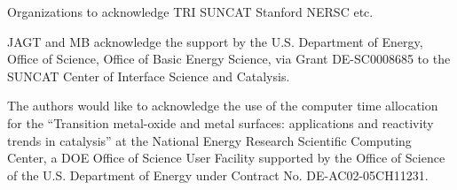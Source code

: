 

Organizations to acknowledge
TRI
SUNCAT
Stanford
NERSC
etc.

JAGT and MB acknowledge the support by the U.S. Department of Energy, Office
of Science, Office of Basic Energy Science, via Grant DE-SC0008685 to the
SUNCAT Center of Interface Science and Catalysis.

The authors would like to acknowledge the use of the computer time allocation
for the “Transition metal-oxide and metal surfaces: applications and
reactivity trends in catalysis” at the National Energy Research Scientific
Computing Center, a DOE Office of Science User Facility supported by the
Office of Science of the U.S. Department of Energy under Contract No.
DE-AC02-05CH11231.
